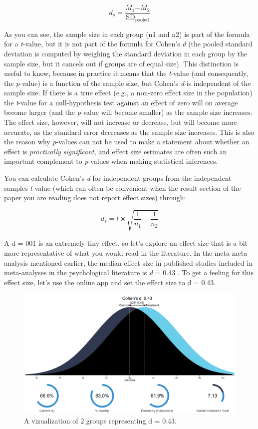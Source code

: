 \documentclass[
]{krantz}
\begin{document}
\[d_s = \frac{{\overline{M}}_{1}{-\overline{M}}_{2}}{\text{SD}_{\text{pooled}}}\]

As you can see, the sample size in each group (n1 and n2) is part of the formula for a \emph{t}-value, but it is not part of the formula for Cohen's \emph{d} (the pooled standard deviation is computed by weighing the standard deviation in each group by the sample size, but it cancels out if groups are of equal size). This distinction is useful to know, because in practice it means that the \emph{t}-value (and consequently, the \emph{p}-value) is a function of the sample size, but Cohen's \emph{d} is independent of the sample size. If there is a true effect (e.g., a non-zero effect size in the population) the \emph{t}-value for a null-hypothesis test against an effect of zero will on average become larger (and the \emph{p}-value will become smaller) as the sample size increases. The effect size, however, will not increase or decrease, but will become more accurate, as the standard error decreases as the sample size increases. This is also the reason why \emph{p}-values can not be used to make a statement about whether an effect is \emph{practically significant}, and effect size estimates are often such an important complement to \emph{p}-values when making statistical inferences.

You can calculate Cohen's \emph{d} for independent groups from the independent samples \emph{t}-value (which can often be convenient when the result section of the paper you are reading does not report effect sizes) through:

\[d_s = t ⨯ \sqrt{\frac{1}{n_{1}} + \frac{1}{n_{2}}}\]

A d = 001 is an extremely tiny effect, so let's explore an effect size that is a bit more representative of what you would read in the literature. In the meta-meta-analysis mentioned earlier, the median effect size in published studies included in meta-analyses in the psychological literature is \emph{d} = 0.43 \citep{richard_one_2003}. To get a feeling for this effect size, let's use the online app and set the effect size to d = 0.43.

\begin{figure}

{\centering \includegraphics[width=1\linewidth]{images/rpsychd2} 

}

\caption{A vizualization of 2 groups representing d = 0.43.}\label{fig:rpsychd2}
\end{figure}
\end{document}

